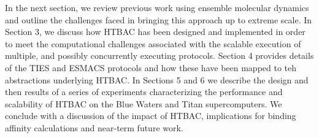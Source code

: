 In the next section, we review previous work using ensemble molecular dynamics and outline 
the challenges faced in bringing this approach up to extreme scale.
In Section 3, we discuss how HTBAC has been designed and implemented in order to meet the 
computational challenges associated with the scalable execution of multiple, and possibly 
concurrently executing protocols. 
Section 4 provides details of the TIES and ESMACS protocols and how these have been mapped 
to teh abstractions underlying HTBAC. 
In Sections 5 and 6 we describe the design and then results of a series of experiments 
characterizing the performance and scalability of HTBAC on the Blue Waters and Titan 
supercomputers.
We conclude with a discussion of the impact of HTBAC, implications for binding
affinity calculations and near-term future work.
